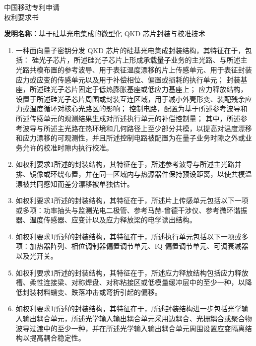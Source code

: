 \documentclass[12pt,a4paper]{article}
\begin{document}
\begin{center}
    {\Large\heiti 中国移动专利申请} \\[0.5em]
    {\Huge\heiti 权利要求书} \\[0.8em]
\end{center}

\noindent\textbf{发明名称：}基于硅基光电集成的微型化 QKD 芯片封装与校准技术

\vspace{0.8em}

\begin{enumerate}[
    label=\arabic*.,
    leftmargin=0pt,
    itemindent=2em,
    labelsep=0.5em,
    align=left,
    itemsep=0.6em,
    topsep=0pt
]

\item 一种面向量子密钥分发 QKD 芯片的硅基光电集成封装结构，其特征在于，包括：
硅光子芯片，所述硅光子芯片上形成承载量子业务的主光路、与所述主光路共模布置的参考波导、用于表征温度漂移的片上传感单元、用于表征封装应力或应变的传感单元以及用于补偿相位、偏置或损耗的执行单元；
封装基座，所述硅光子芯片固定于低热膨胀基座或低应力基座上；
应力释放结构，设置于所述硅光子芯片周围或封装互连区域，用于减小外壳形变、装配残余应力或温度循环对核心光路区的影响；
控制电路，配置为基于所述参考波导和所述传感单元的观测结果生成对所述执行单元的补偿控制量；
其中，所述参考波导与所述主光路在热环境和几何路径上至少部分共模，以提高对温度漂移和应力漂移的可观测性，并且所述控制电路被配置为在量子业务时隙之外或业务允许的校准时隙内执行校准。

\item 如权利要求1所述的封装结构，其特征在于，所述参考波导与所述主光路并排、镜像或环绕布置，并在同一区域内与热源器件保持预设距离，以使共模温漂被共同感知而差分漂移被单独估计。

\item 如权利要求1所述的封装结构，其特征在于，所述片上传感单元包括以下一项或多项：功率抽头与监测光电二极管、参考马赫-曾德干涉仪、参考微环谐振器、温度传感器、应变计以及应力释放梁的电学读出结构。

\item 如权利要求1所述的封装结构，其特征在于，所述执行单元包括以下一项或多项：加热器阵列、相位调制器偏置调节单元、IQ 偏置调节单元、可调衰减器以及光开关。

\item 如权利要求1所述的封装结构，其特征在于，所述应力释放结构包括应力释放槽、柔性连接梁、对称焊盘、对称粘接区或低模量缓冲层中的至少一种，以降低封装材料蠕变、跌落冲击或弯折引起的偏移。

\item 如权利要求1所述的封装结构，其特征在于，所述封装结构进一步包括光学输入输出耦合单元，所述光学输入输出耦合单元采用边耦合、光栅耦合或聚合物波导过渡中的至少一种，并在所述光学输入输出耦合单元周围设置应变隔离结构以提高耦合稳定性。


\end{enumerate}
\end{document}

